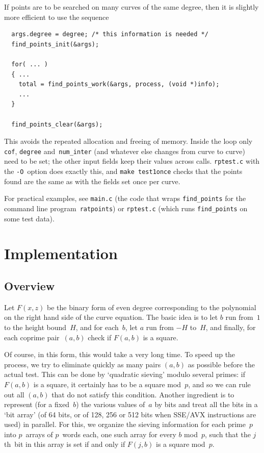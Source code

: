 \documentclass[12pt,a4paper,oneside]{amsart}
\begin{document}
If points are to be searched on many curves of the same degree,
then it is slightly more efficient to use the sequence

\begin{verbatim}
  args.degree = degree; /* this information is needed */
  find_points_init(&args);

  for( ... )
  { ...
    total = find_points_work(&args, process, (void *)info);
    ...
  }

  find_points_clear(&args);
\end{verbatim}

This avoids the repeated allocation and freeing of memory. Inside the loop
only \texttt{cof}, \texttt{degree} and~\texttt{num\_inter} (and whatever
else changes from curve to curve) need to be set; the other input fields
keep their values across calls. \texttt{rptest.c} with
the \verb+-O+~option does exactly this, and \texttt{make test1once} checks
that the points found are the same as with the fields set once per curve.

For practical examples, see \texttt{main.c} (the code that wraps
\texttt{find\_points} for the command line program~\texttt{ratpoints}) or
\texttt{rptest.c} (which runs \texttt{find\_points} on some test data).


\section{Implementation} \label{impl}

\subsection{Overview}

Let $F(x, z)$ be the binary form of even degree corresponding to the
polynomial on the right hand side of the curve equation. The basic idea
is to let $b$ run from~$1$ to the height bound~$H$, and for each~$b$, let
$a$ run from $-H$ to~$H$, and finally, for each coprime pair~$(a,b)$ check
if $F(a, b)$ is a square.

Of course, in this form, this would take a very long time. To speed up the
process, we try to eliminate quickly as many pairs $(a, b)$ as possible
before the actual test. This can be done by `quadratic sieving' modulo
several primes: if $F(a, b)$ is a square, it certainly has to be a square
mod~$p$, and so we can rule out all $(a, b)$ that do not satisfy this
condition. Another ingredient is to represent (for a fixed~$b$) the
various values of~$a$ by bits and treat all the bits in a `bit array'
(of 64 bits, or of 128, 256 or 512 bits when SSE/AVX instructions are
used) in parallel. For this, we organize the sieving information for each
prime~$p$ into $p$~arrays of $p$~words each, one such array for every $b$
mod~$p$, such that the $j$th~bit in this array is set if and only if
$F(j, b)$ is a square mod~$p$.
\end{document}
